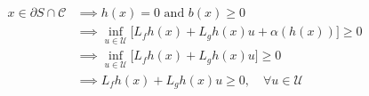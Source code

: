 \documentclass[preview]{standalone}
\begin{document}
\begin{align*}
x \in \partial S \cap \mathcal{C} &\implies h(x) = 0 \text{ and } b(x) \geq 0\\ &\implies \inf_{u \in \mathcal{U}} \big [ L_fh(x) + L_gh(x) u + \alpha(h(x)) \big] \geq 0\\ &\implies \inf_{u \in \mathcal{U}} \big [ L_fh(x) + L_gh(x) u \big] \geq 0\\ &\implies L_fh(x) + L_gh(x) u \geq 0, \quad \forall u \in \mathcal{U}
\end{align*}
\end{document}
